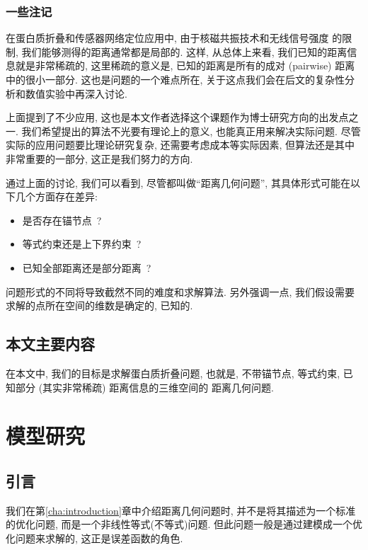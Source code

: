 \documentclass{CASthesis_zzk}
\begin{document}
\subsection{一些注记}
在蛋白质折叠和传感器网络定位应用中, 由于核磁共振技术和无线信号强度
的限制, 我们能够测得的距离通常都是局部的.
这样, 从总体上来看, 我们已知的距离信息就是非常稀疏的,
这里稀疏的意义是, 已知的距离是所有的成对 (pairwise) 距离中的很小一部分.
这也是问题的一个难点所在, 关于这点我们会在后文的复杂性分析和数值实验中再深入讨论.

上面提到了不少应用, 这也是本文作者选择这个课题作为博士研究方向的出发点之一.
我们希望提出的算法不光要有理论上的意义, 也能真正用来解决实际问题.
尽管实际的应用问题要比理论研究复杂, 还需要考虑成本等实际因素,
但算法还是其中非常重要的一部分, 这正是我们努力的方向.

通过上面的讨论, 我们可以看到, 
尽管都叫做``距离几何问题'', 其具体形式可能在以下几个方面存在差异:
\begin{itemize}
  \item 是否存在锚节点~?
  \item 等式约束还是上下界约束~?
  \item 已知全部距离还是部分距离~?
\end{itemize}
问题形式的不同将导致截然不同的难度和求解算法.
另外强调一点, 我们假设需要求解的点所在空间的维数是确定的, 已知的.


 
\section{本文主要内容}

在本文中, 我们的目标是求解蛋白质折叠问题,
也就是, 不带锚节点, 等式约束, 
已知部分 (其实非常稀疏) 距离信息的三维空间的
距离几何问题.

\chapter{模型研究}
\label{cha:models}

\section{引言}
我们在第\ref{cha:introduction}章中介绍距离几何问题时, 
并不是将其描述为一个标准的优化问题, 而是一个非线性等式(不等式)问题.
但此问题一般是通过建模成一个优化问题来求解的, 这正是误差函数的角色.
\end{document}
